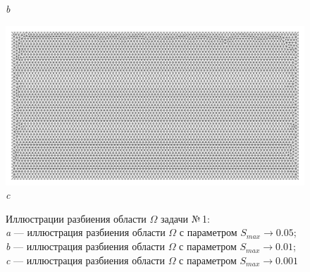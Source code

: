 \documentclass[12pt, a4paper]{article}
\begin{document}
\begin{figure}[h]
\begin{center}
{\begin{minipage}{0.45\textwidth}
									\textit{b} 
								\end{minipage}                                 
							} 
							{ 
								\begin{minipage}{0.9\textwidth} 
									\centering 
									\includegraphics[width=1\columnwidth]{rect_dirichlet_only_0001_calfem_net.pdf}\\ 
									\textit{c} 
								\end{minipage}                                 
							} 						
						\end{center} 
						\vspace*{-0.0mm} 
						\caption{Иллюстрации разбиения области $\Omega$ задачи №\,1:\\
							\textit{a} --- иллюстрация разбиения области $\Omega$ с параметром $S_{max} \rightarrow 0.05$; \\
							\textit{b} --- иллюстрация разбиения области $\Omega$ с параметром $S_{max} \rightarrow  0.01$; \\
							\textit{c} --- иллюстрация разбиения области $\Omega$ с параметром $S_{max} \rightarrow 0.001$
						} 
					\end{figure}
		
			
			\newpage
			
\end{document}
